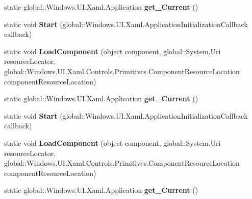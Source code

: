 \begin{DoxyCompactItemize}
\item 
\mbox{\label{class_windows_1_1_u_i_1_1_xaml_1_1_application_a67de5f31e8c62b36f27fe9170f5ac9fb}} 
static global\+::\+Windows.\+U\+I.\+Xaml.\+Application {\bfseries get\+\_\+\+Current} ()
\item 
\mbox{\label{class_windows_1_1_u_i_1_1_xaml_1_1_application_a189d758fa0e7520f135ecd26a2870c89}} 
static void {\bfseries Start} (global\+::\+Windows.\+U\+I.\+Xaml.\+Application\+Initialization\+Callback callback)
\item 
\mbox{\label{class_windows_1_1_u_i_1_1_xaml_1_1_application_a4be9e0fc67a57424825b3e404fe57c2d}} 
static void {\bfseries Load\+Component} (object component, global\+::\+System.\+Uri resource\+Locator, global\+::\+Windows.\+U\+I.\+Xaml.\+Controls.\+Primitives.\+Component\+Resource\+Location component\+Resource\+Location)
\item 
\mbox{\label{class_windows_1_1_u_i_1_1_xaml_1_1_application_a67de5f31e8c62b36f27fe9170f5ac9fb}} 
static global\+::\+Windows.\+U\+I.\+Xaml.\+Application {\bfseries get\+\_\+\+Current} ()
\item 
\mbox{\label{class_windows_1_1_u_i_1_1_xaml_1_1_application_a189d758fa0e7520f135ecd26a2870c89}} 
static void {\bfseries Start} (global\+::\+Windows.\+U\+I.\+Xaml.\+Application\+Initialization\+Callback callback)
\item 
\mbox{\label{class_windows_1_1_u_i_1_1_xaml_1_1_application_a4be9e0fc67a57424825b3e404fe57c2d}} 
static void {\bfseries Load\+Component} (object component, global\+::\+System.\+Uri resource\+Locator, global\+::\+Windows.\+U\+I.\+Xaml.\+Controls.\+Primitives.\+Component\+Resource\+Location component\+Resource\+Location)
\item 
\mbox{\label{class_windows_1_1_u_i_1_1_xaml_1_1_application_a67de5f31e8c62b36f27fe9170f5ac9fb}} 
static global\+::\+Windows.\+U\+I.\+Xaml.\+Application {\bfseries get\+\_\+\+Current} ()

\end{DoxyCompactItemize}
